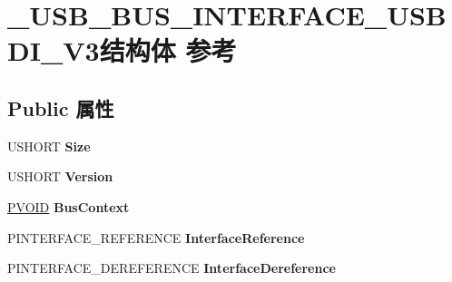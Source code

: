 \hypertarget{struct___u_s_b___b_u_s___i_n_t_e_r_f_a_c_e___u_s_b_d_i___v3}{}\section{\+\_\+\+U\+S\+B\+\_\+\+B\+U\+S\+\_\+\+I\+N\+T\+E\+R\+F\+A\+C\+E\+\_\+\+U\+S\+B\+D\+I\+\_\+\+V3结构体 参考}
\label{struct___u_s_b___b_u_s___i_n_t_e_r_f_a_c_e___u_s_b_d_i___v3}
\subsection*{Public 属性}
\begin{DoxyCompactItemize}
\item 
\mbox{\label{struct___u_s_b___b_u_s___i_n_t_e_r_f_a_c_e___u_s_b_d_i___v3_ac06e25bd10dcfe2e7d4daa6ee2c62f9a}} 
U\+S\+H\+O\+RT {\bfseries Size}
\item 
\mbox{\label{struct___u_s_b___b_u_s___i_n_t_e_r_f_a_c_e___u_s_b_d_i___v3_ae2b79fb54f1efbd05f6705d3b713f6c5}} 
U\+S\+H\+O\+RT {\bfseries Version}
\item 
\mbox{\label{struct___u_s_b___b_u_s___i_n_t_e_r_f_a_c_e___u_s_b_d_i___v3_aa8e56676a8f8a9121fb906d50b420e83}} 
\hyperlink{interfacevoid}{P\+V\+O\+ID} {\bfseries Bus\+Context}
\item 
\mbox{\label{struct___u_s_b___b_u_s___i_n_t_e_r_f_a_c_e___u_s_b_d_i___v3_a03b9ffb536531f9f8d6a72f2320ab377}} 
P\+I\+N\+T\+E\+R\+F\+A\+C\+E\+\_\+\+R\+E\+F\+E\+R\+E\+N\+CE {\bfseries Interface\+Reference}
\item 
\mbox{\label{struct___u_s_b___b_u_s___i_n_t_e_r_f_a_c_e___u_s_b_d_i___v3_a7557cb83d1debade899ec0322f552e81}} 
P\+I\+N\+T\+E\+R\+F\+A\+C\+E\+\_\+\+D\+E\+R\+E\+F\+E\+R\+E\+N\+CE {\bfseries Interface\+Dereference}
\item 
\mbox{\label{struct___u_s_b___b_u_s___i_n_t_e_r_f_a_c_e___u_s_b_d_i___v3_a7c44af487ae76af43b1fe9956721abbb}} 

\end{DoxyCompactItemize}
